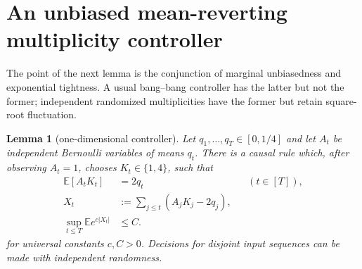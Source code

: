 \documentclass[11pt]{article}
\newtheorem{lemma}[theorem]{Lemma}
\theoremstyle{remark}
\newcommand{\E}{\mathbb E}
\begin{document}
\section{An unbiased mean-reverting multiplicity controller}

The point of the next lemma is the conjunction of marginal unbiasedness and
exponential tightness.  A usual bang--bang controller has the latter but not
the former; independent randomized multiplicities have the former but retain
square-root fluctuation.

\begin{lemma}[one-dimensional controller]\label{lem:controller}
Let $q_1,\ldots,q_T\in[0,1/4]$ and let $A_t$ be independent Bernoulli
variables of means $q_t$.  There is a causal rule which, after observing
$A_t=1$, chooses $K_t\in\{1,4\}$, such that
\begin{align}
  \E[A_tK_t]&=2q_t &&(t\in[T]),\label{eq:marginal}\\
  X_t&:=\sum_{j\le t}(A_jK_j-2q_j),\label{eq:state}\\
  \sup_{t\le T}\E e^{c|X_t|}&\le C.\label{eq:exp-moment}
\end{align}
for universal constants $c,C>0$.  Decisions for disjoint input sequences can
be made with independent randomness.
\end{lemma}
\end{document}
